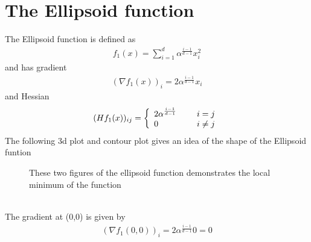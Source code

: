\documentclass[a4paper]{article}
\begin{document}
\section{The Ellipsoid function}
The Ellipsoid function is defined as
\begin{align*}
  f_1(x) = \sum_{i=1}^d \alpha^{\frac{i-1}{d-1}} x_i^2
\end{align*}
and has gradient
\begin{align*}
  (\nabla f_1(x))_i = 2\alpha^{\frac{i-1}{d-1}} x_i
\end{align*}
and Hessian
\begin{align*}
  (Hf_1(x))_{ij} =
  \left\{
  \begin{array}{ll}
    2 \alpha^{\frac{i-1}{d-1}} \hspace*{5mm}  & i=j\\
    0                                     & i\neq j
  \end{array}
  \right.
\end{align*}
The following 3d plot and contour plot gives an idea of the shape of the Ellipsoid funtion 
\begin{figure}[h]
    \centering
    \qquad
    \caption{These two figures of the ellipsoid function demonstrates the local minimum of the function}%
    \label{fig:1}%
\end{figure}\\
The gradient at (0,0) is given by
\begin{align*}
  (\nabla f_1(0,0))_i = 2\alpha^{\frac{i-1}{d-1}} 0 = 0 
\end{align*}
\end{document}
